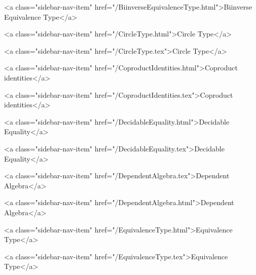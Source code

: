           <a class="sidebar-nav-item" href="/BiinverseEquivalenceType.html">Biinverse Equivalence Type</a>
        
      
    
      
        
          <a class="sidebar-nav-item" href="/CircleType.html">Circle Type</a>
        
      
    
      
        
          <a class="sidebar-nav-item" href="/CircleType.tex">Circle Type</a>
        
      
    
      
        
          <a class="sidebar-nav-item" href="/CoproductIdentities.html">Coproduct identities</a>
        
      
    
      
        
          <a class="sidebar-nav-item" href="/CoproductIdentities.tex">Coproduct identities</a>
        
      
    
      
        
          <a class="sidebar-nav-item" href="/DecidableEquality.html">Decidable Equality</a>
        
      
    
      
        
          <a class="sidebar-nav-item" href="/DecidableEquality.tex">Decidable Equality</a>
        
      
    
      
        
          <a class="sidebar-nav-item" href="/DependentAlgebra.tex">Dependent Algebra</a>
        
      
    
      
        
          <a class="sidebar-nav-item" href="/DependentAlgebra.html">Dependent Algebra</a>
        
      
    
      
        
          <a class="sidebar-nav-item" href="/EquivalenceType.html">Equivalence Type</a>
        
      
    
      
        
          <a class="sidebar-nav-item" href="/EquivalenceType.tex">Equivalence Type</a>
        
